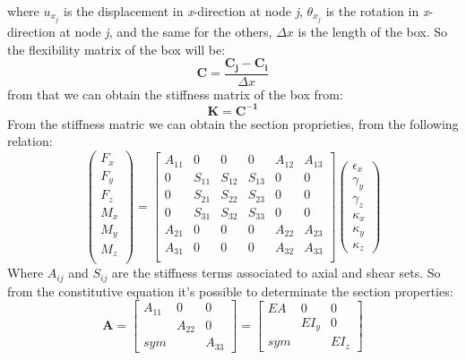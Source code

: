 where $u_{x_j}$ is the displacement in \textit{x}-direction at node \textit{j}, $\theta_{x_j}$ is the rotation in \textit{x}-direction at node \textit{j}, and the same for the others, $\Delta x$ is the length of the box. So the flexibility matrix of the box will be:
\begin{equation*}
\mathbf{C}=\frac{\mathbf{C_j}-\mathbf{C_i}}{\Delta x}
\end{equation*}
from that we can obtain the stiffness matrix of the box from:
\begin{equation*}
\mathbf{K}=\mathbf{C^{-1}}
\end{equation*}
From the stiffness matric we can obtain the section proprieties, from the following relation:
\begin{equation*}
\begin{pmatrix}
F_x\\
F_y\\
F_z\\
M_x\\
M_y\\
M_z\\
\end{pmatrix} =
\begin{bmatrix}
A_{11}&0&0&0&A_{12}&A_{13}\\
0&S_{11}&S_{12}& S_{13}&0&0   \\
0&S_{21}&S_{22}& S_{23}&0&0   \\
0&S_{31}&S_{32}& S_{33}&0&0   \\
A_{21}&0&0&0&A_{22}&A_{23}\\
A_{31}&0&0&0&A_{32}&A_{33}\\
\end{bmatrix}
\begin{pmatrix}
\epsilon_x \\
\gamma_y \\
\gamma_z \\
\kappa_x \\
\kappa_y \\
\kappa_z 
\end{pmatrix}
\end{equation*}
Where $A_{ij}$ and $S_{ij}$ are the stiffness terms associated to axial and shear sets. So from the constitutive equation it's possible to determinate the section properties:
\begin{equation*}
\mathbf{A} =
\begin{bmatrix}
A_{11}&0&0\\
&A_{22}&0\\
sym&&A_{33}
\end{bmatrix}=
\begin{bmatrix}
EA&0&0\\
&EI_y&0\\
sym&&EI_z
\end{bmatrix}
\end{equation*}
